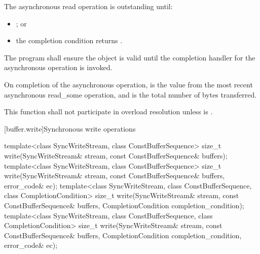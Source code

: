 \begin{itemdescr}
\pnum
 The asynchronous read operation is outstanding until:

\begin{itemize}
\item
{}; or
\item
the completion condition returns .
\end{itemize}

\pnum
The program shall ensure the  object  is valid until the completion handler for the asynchronous operation is invoked.

\pnum
On completion of the asynchronous operation,  is the  value from the most recent asynchronous read_some operation, and  is the total number of bytes transferred.

\pnum
\remarks This function shall not participate in overload resolution unless
 is .
\end{itemdescr}



[buffer.write]{Synchronous write operations}

%
\begin{itemdecl}
template<class SyncWriteStream, class ConstBufferSequence>
  size_t write(SyncWriteStream& stream,
               const ConstBufferSequence& buffers);
template<class SyncWriteStream, class ConstBufferSequence>
  size_t write(SyncWriteStream& stream,
               const ConstBufferSequence& buffers, error_code& ec);
template<class SyncWriteStream, class ConstBufferSequence,
  class CompletionCondition>
    size_t write(SyncWriteStream& stream,
                 const ConstBufferSequence& buffers,
                 CompletionCondition completion_condition);
template<class SyncWriteStream, class ConstBufferSequence,
  class CompletionCondition>
    size_t write(SyncWriteStream& stream,
                 const ConstBufferSequence& buffers,
                 CompletionCondition completion_condition,
                 error_code& ec);
\end{itemdecl}

